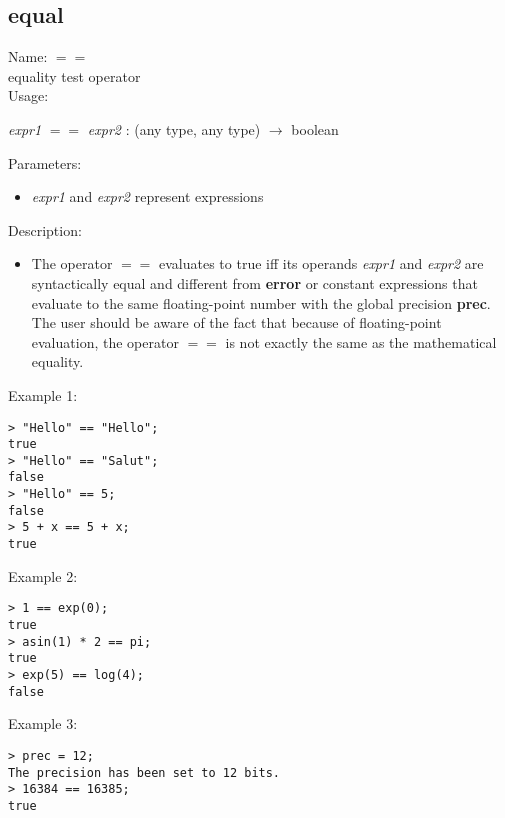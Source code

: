 \subsection{equal}
\label{labequal}
\noindent Name: \textbf{$==$}\\
equality test operator\\

\noindent Usage: 
\begin{center}
\emph{expr1} \textbf{$==$} \emph{expr2} : (\textsf{any type}, \textsf{any type}) $\rightarrow$ \textsf{boolean}\\
\end{center}
Parameters: 
\begin{itemize}
\item \emph{expr1} and \emph{expr2} represent expressions
\end{itemize}
\noindent Description: \begin{itemize}

\item The operator \textbf{$==$} evaluates to true iff its operands \emph{expr1} and
   \emph{expr2} are syntactically equal and different from \textbf{error} or constant
   expressions that evaluate to the same floating-point number with the
   global precision \textbf{prec}. The user should be aware of the fact that
   because of floating-point evaluation, the operator \textbf{$==$} is not
   exactly the same as the mathematical equality.
\end{itemize}
\noindent Example 1: 
\begin{center}\begin{minipage}{15cm}\begin{Verbatim}[frame=single]
> "Hello" == "Hello";
true
> "Hello" == "Salut";
false
> "Hello" == 5;
false
> 5 + x == 5 + x;
true
\end{Verbatim}
\end{minipage}\end{center}
\noindent Example 2: 
\begin{center}\begin{minipage}{15cm}\begin{Verbatim}[frame=single]
> 1 == exp(0);
true
> asin(1) * 2 == pi;
true
> exp(5) == log(4);
false
\end{Verbatim}
\end{minipage}\end{center}
\noindent Example 3: 
\begin{center}\begin{minipage}{15cm}\begin{Verbatim}[frame=single]
> prec = 12;
The precision has been set to 12 bits.
> 16384 == 16385;
true
\end{Verbatim}
\end{minipage}\end{center}

